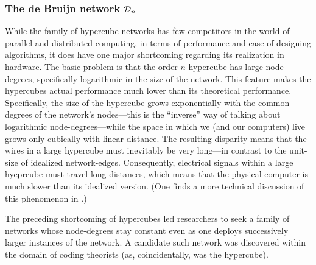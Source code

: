 \subsubsection{The de Bruijn network $\mbox{$\cal D$}_n$}
\label{sec:deBruijn-network}

While the family of hypercube networks has few competitors in the
world of parallel and distributed computing, in terms of performance
and ease of designing algorithms, it does have one major shortcoming
regarding its realization in hardware.  The basic problem is that the
order-$n$ hypercube has large node-degrees, specifically logarithmic
in the size of the network.  This feature makes the hypercubes actual
performance much lower than its theoretical performance.
Specifically, the size of the hypercube grows exponentially with the
common degrees of the network's nodes---this is the ``inverse'' way
of talking about logarithmic node-degrees---while the space in which
we (and our computers) live grows only cubically with linear
distance.  The resulting disparity means that the wires in a large
hypercube must inevitably be very long---in contrast to the unit-size
of idealized network-edges.  Consequently, electrical signals within a
large hyeprcube must travel long distances, which means that the
physical computer is much slower than its idealized version.  (One
finds a more technical discussion of this phenomenon in
\cite{Ullman84}.)

The preceding shortcoming of hypercubes led researchers to seek a
family of networks whose node-degrees stay constant even as one
deploys successively larger instances of the network.  A candidate
such network was discovered within the domain of coding theorists (as,
coincidentally, was the hypercube).  

